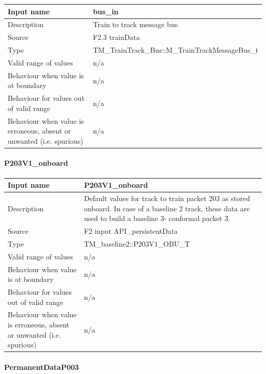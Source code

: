 \begin{longtable}{p{}p{}}
\toprule
Input name				& bus\_in\\
\midrule
Description				& Train to track message bus  \\
\midrule
Source					& F2.3 trainData\\ 
\midrule
Type					& TM\_TrainTrack\_Bus::M\_TrainTrackMessageBus\_t\\
\midrule
Valid range of values	& n/a \\
\midrule
Behaviour when value is at boundary	& n/a\\
\midrule
Behaviour for values out of valid range	& n/a\\
\midrule
Behaviour when value is erroneous, absent or unwanted (i.e. spurious) & n/a\\

\bottomrule


\end{longtable}




\paragraph{P203V1\_onboard}

\begin{longtable}{p{}p{}}
\toprule
Input name				& P203V1\_onboard\\
\midrule
Description				& Default values for track to train packet 203 as stored onboard. In case of a baseline 2 track, these data are used to build a baseline 3- conformal packet 3. \\
\midrule
Source					& F2 input API\_persistentData\\ 
\midrule
Type					& TM\_baseline2::P203V1\_OBU\_T\\
\midrule
Valid range of values	& n/a \\
\midrule
Behaviour when value is at boundary	& n/a\\
\midrule
Behaviour for values out of valid range	& n/a\\
\midrule
Behaviour when value is erroneous, absent or unwanted (i.e. spurious) & n/a\\

\bottomrule


\end{longtable}

\paragraph{PermanentDataP003}

